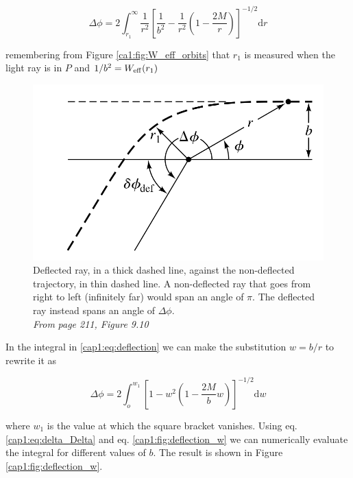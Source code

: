 \begin{equation}
    \Delta \phi = 2\int_{r_1}^\infty \frac{1}{r^2} \left[\frac{1}{b^2}
    - \frac{1}{r^2} \left(1 - \frac{2M}{r} \right) \right]^{-1/2} \mathrm{d}r
    \label{cap1:eq:deflection}
\end{equation}

remembering from Figure \ref{ca1:fig:W_eff_orbits} that $r_1$ is measured when
the light ray is in $P$ and $1 / b^2 = W_{\rm eff}(r_1)$

\begin{figure}[h]
    \centering
    \includegraphics[width = 0.5 \textwidth]{Figures/chapter1/deflection.png}
    \caption{Deflected ray, in a thick dashed line, against the non-deflected
    trajectory, in thin dashed line.
    A non-deflected ray that goes from right to left (infinitely far) would span
    an angle of $\pi$.
    The deflected ray instead spans an angle of $\Delta \phi$. \\
    \textit{From} \cite{hartle2021gravity} \textit{page 211, Figure 9.10}}
    \label{cap1:fig:deflection}
\end{figure}

In the integral in \ref{cap1:eq:deflection} we can make the substitution
$w = b / r$ to rewrite it as

\begin{equation}
    \Delta \phi = 2 \int_o^{w_1}
    \left[1 - w^2 \left(1 - \frac{2M}{b}w\right)\right]^{-1/2} \mathrm{d}w
    \label{cap1:eq:deflection_w}
\end{equation}

where $w_1$ is the value at which the square bracket vanishes.
Using eq. \ref{cap1:eq:delta_Delta} and eq. \ref{cap1:fig:deflection_w} we can
numerically evaluate the integral for different values of $b$.
The result is shown in Figure \ref{cap1:fig:deflection_w}.

